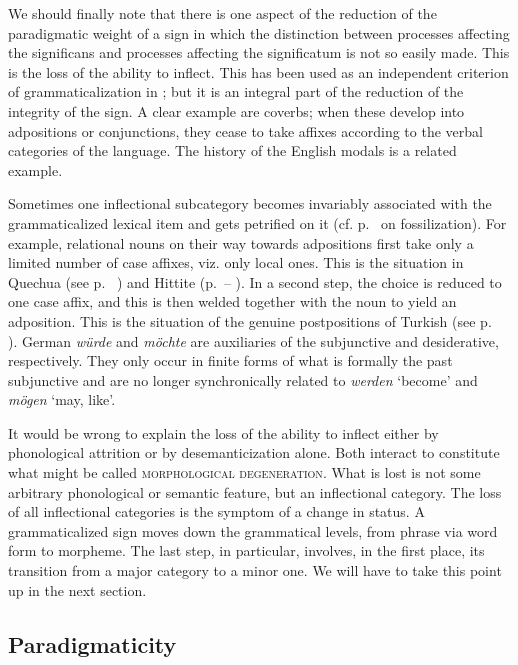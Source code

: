 We should finally note that there is one aspect of the reduction of the paradigmatic weight of a sign in which the distinction between processes affecting the significans and processes affecting the significatum is not so easily made. This is the loss of the ability to inflect. This has been used as an independent criterion of grammaticalization in \citet[84]{Givón1975}; but it is an integral part of the reduction of the integrity of the sign. A clear example are coverbs; when these develop into adpositions or conjunctions, they cease to take affixes according to the verbal categories of the language. The history of the English modals is a related example.

Sometimes one inflectional subcategory becomes invariably associated with the grammaticalized lexical item and gets petrified on it (cf. p.~\pageref{page147}\chk%
  on fossilization). For example, relational nouns on their way towards adpositions first take only a limited number of case affixes, viz. only local ones. This is the situation in Quechua (see p.~\pageref{page87}\chk%
) and Hittite (p.~\pageref{page98}--\pageref{page100b}\chk%
). In a second step, the choice is reduced to one case affix, and this is then welded together with the noun to yield an adposition. This is the situation of the genuine postpositions of Turkish (see p.~\pageref{page86}\chk%
). German \textit{würde} and \textit{möchte} are auxiliaries of the subjunctive and desiderative, respectively. They only occur in finite forms of what is formally the past subjunctive and are no longer synchronically related to \textit{werden} ‘become’ and \textit{mögen} ‘may, like’.

It would be wrong to explain the loss of the ability to inflect either by phonological attrition or by desemanticization alone. Both interact to constitute what might be called \textsc{morphological degeneration}. What is lost is not some arbitrary phonological or semantic feature, but an inflectional category. The loss of all inflectional categories is the symptom of a change in status. A grammaticalized sign moves down the grammatical levels, from phrase via word form to morpheme. The last step, in particular,  involves, in the first place, its transition from a major category to a minor one. We will have to take this point up in the next section.

\subsection{Paradigmaticity} \label{sec:4.2.2}

